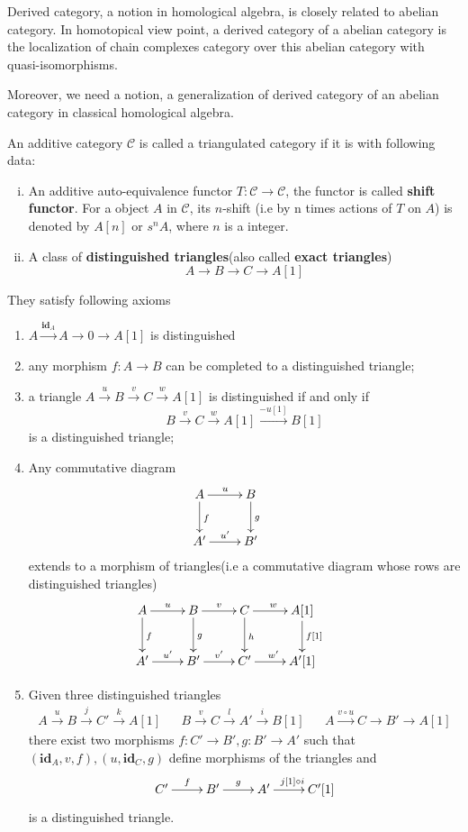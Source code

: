 Derived category, a notion in homological algebra, is closely related to abelian category. In homotopical view point, a derived category of a abelian category is the localization of chain complexes category over this abelian category with quasi-isomorphisms.
\par
Moreover, we need a notion, a generalization of derived category of an abelian category in classical homological algebra.
\begin{mydefn}
An additive category $\mathcal{C}$ is called a triangulated category if it is with following data:
\begin{enumerate}[(i)]
    \item An additive auto-equivalence functor $T : \mathcal{C}\rightarrow \mathcal{C}$, the functor is called \textbf{shift functor}. For a object $A$ in $\mathcal{C}$, its $n$-shift (i.e by n times actions of $T$ on $A$) is denoted by $A[n]$ or $s^{n}A$, where $n$ is a integer. 
    \item A class of \textbf{distinguished triangles}(also called \textbf{exact triangles})
    \[
    A \rightarrow B \rightarrow C \rightarrow A[1]
    \]
\end{enumerate}
They satisfy following axioms
\begin{enumerate}[TR1]
    \item $A \xrightarrow{\textbf{id}_{A}} A \rightarrow 0 \rightarrow A[1]$ is distinguished
    \item any morphism $f: A \rightarrow B$ can be completed to a distinguished triangle;
    \item a triangle $A \xrightarrow{u} B \xrightarrow{v} C \xrightarrow{w} A[1]$ is distinguished if and only if 
    \[
    B \xrightarrow{v} C \xrightarrow{w} A[1] \xrightarrow{-u[1]} B[1]
    \]
    is a distinguished triangle;
    \item Any commutative diagram
    \[
    \xymatrix{
    A \ar[r]^{u} \ar[d]^{f} &B \ar[d]^{g} &\\
    A' \ar[r]^{u'}& B' &
    }\]
    extends to a morphism of triangles(i.e a commutative diagram whose rows are distinguished triangles)
    \[
    \xymatrix{
    A \ar[r]^{u} \ar[d]^{f} & B \ar[r]^{v} \ar[d]^{g} & C \ar[r]^{w} \ar[d]^{h} & A[1] \ar[d]^{f[1]}&\\
    A' \ar[r]^{u'}& B' \ar[r]^{v'} & C' \ar[r]^{w'} & A'[1]
    }\]
    \item Given three distinguished triangles
    \begin{align*}
        A \xrightarrow{u} B \xrightarrow{j} C' \xrightarrow{k} A[1]& &B \xrightarrow{v} C \xrightarrow{l} A' \xrightarrow{i} B[1]& &A \xrightarrow{v \circ u} C \rightarrow B' \rightarrow A[1]
    \end{align*}
    there exist two morphisms $f: C' \rightarrow B', g: B' \rightarrow A'$ such that$(\textbf{id}_{A},v,f),(u,\textbf{id}_{C},g)$ define morphisms of the triangles and \[
    \xymatrix{C' \ar[r]^{f} &B' \ar[r]^{g} & A' \ar[r]^{j[1] \circ i}& C'[1]}
    \]
    is a distinguished triangle.
\end{enumerate}
\end{mydefn}

